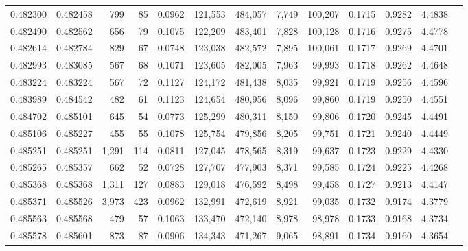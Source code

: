\begin{tabular}{rrrrrrrrrrrrr}
0.482300 & 0.482458 &   799 &    85 &                                     0.0962 & 121,553 & 484,057 &   7,749 & 100,207 & 0.1715 & 0.9282 & 4.4838 \\
0.482490 & 0.482562 &   656 &    79 &                                     0.1075 & 122,209 & 483,401 &   7,828 & 100,128 & 0.1716 & 0.9275 & 4.4778 \\
0.482614 & 0.482784 &   829 &    67 &                                     0.0748 & 123,038 & 482,572 &   7,895 & 100,061 & 0.1717 & 0.9269 & 4.4701 \\
0.482993 & 0.483085 &   567 &    68 &                                     0.1071 & 123,605 & 482,005 &   7,963 &  99,993 & 0.1718 & 0.9262 & 4.4648 \\
0.483224 & 0.483224 &   567 &    72 &                                     0.1127 & 124,172 & 481,438 &   8,035 &  99,921 & 0.1719 & 0.9256 & 4.4596 \\
0.483989 & 0.484542 &   482 &    61 &                                     0.1123 & 124,654 & 480,956 &   8,096 &  99,860 & 0.1719 & 0.9250 & 4.4551 \\
0.484702 & 0.485101 &   645 &    54 &                                     0.0773 & 125,299 & 480,311 &   8,150 &  99,806 & 0.1720 & 0.9245 & 4.4491 \\
0.485106 & 0.485227 &   455 &    55 &                                     0.1078 & 125,754 & 479,856 &   8,205 &  99,751 & 0.1721 & 0.9240 & 4.4449 \\
0.485251 & 0.485251 & 1,291 &   114 &                                     0.0811 & 127,045 & 478,565 &   8,319 &  99,637 & 0.1723 & 0.9229 & 4.4330 \\
0.485265 & 0.485357 &   662 &    52 &                                     0.0728 & 127,707 & 477,903 &   8,371 &  99,585 & 0.1724 & 0.9225 & 4.4268 \\
0.485368 & 0.485368 & 1,311 &   127 &                                     0.0883 & 129,018 & 476,592 &   8,498 &  99,458 & 0.1727 & 0.9213 & 4.4147 \\
0.485371 & 0.485526 & 3,973 &   423 &                                     0.0962 & 132,991 & 472,619 &   8,921 &  99,035 & 0.1732 & 0.9174 & 4.3779 \\
0.485563 & 0.485568 &   479 &    57 &                                     0.1063 & 133,470 & 472,140 &   8,978 &  98,978 & 0.1733 & 0.9168 & 4.3734 \\
0.485578 & 0.485601 &   873 &    87 &                                     0.0906 & 134,343 & 471,267 &   9,065 &  98,891 & 0.1734 & 0.9160 & 4.3654 \\

\end{tabular}
